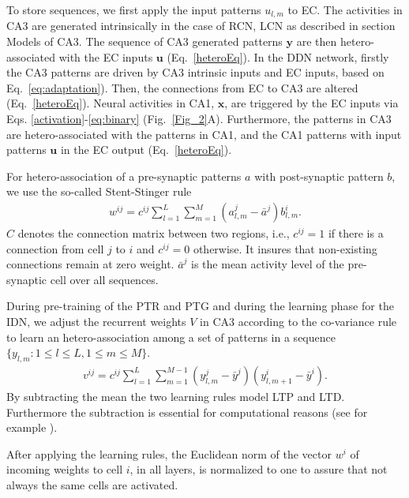 \documentclass[utf8]{frontiersSCNS} %
\begin{document}
To store sequences, we first apply the input patterns $u_{l,m}$ to EC. The activities in CA3 are generated intrinsically in the case of RCN, LCN as described in section Models of CA3. The sequence of CA3 generated patterns $\mathbf y$ are then hetero-associated with the EC inputs $\mathbf u$ (Eq.~\ref{heteroEq}). 
%
In the DDN network, firstly the CA3 patterns are driven by CA3 intrinsic inputs and EC inputs, based on Eq.~\ref{eq:adaptation}). Then, the connections from EC to CA3 are altered (Eq.~\ref{heteroEq}).
%
Neural activities in CA1, $\mathbf x$, are triggered by the EC inputs via Eqs. \ref{activation}-\ref{eq:binary} (Fig.~\ref{Fig_2}A). Furthermore, the patterns in CA3 are hetero-associated with the patterns in CA1, and the CA1 patterns with input patterns $\mathbf u$ in the EC output (Eq.~\ref{heteroEq}). 

For hetero-association of a pre-synaptic patterns $a$ with post-synaptic pattern $b$, we use the so-called Stent-Stinger rule \cite{stent1973physiological}
%
\begin{align}
	\label{heteroEq}
	w^{ij} = c^{ij}\sum_{l=1}^L{\sum_{m=1}^M(a^j_{l, m}  - \bar {a}^j)b_{l, m}^i}.
\end{align}
$C$ denotes the connection matrix between two regions, i.e., $c^{ij} = 1$ if there is a connection from cell $j$ to $i$ and $c^{ij} = 0$ otherwise. It insures that non-existing connections remain at zero weight. $\bar{a}^j$ is the mean activity level of the pre-synaptic cell over all sequences. 

During pre-training of the PTR and PTG and during the learning phase for the IDN, we adjust the recurrent weights $V$ in CA3 according to the co-variance rule \cite{sejnowski1977storing} to learn an hetero-association among a set of patterns in a sequence $\{ y_{l, m}: 1\le l \le L, 1\le m \le M\}$.
\begin{align}
	\label{heteroca3Eq}
	v^{ij} =  c^{ij}\sum_{l=1}^L{\sum_{m=1}^{M-1}(y^j_{l, m}  - \bar {y}^j)(y_{l, m+1}^i - \bar{y}^i)}.
\end{align}
By subtracting the mean the two learning rules model LTP and LTD. Furthermore the subtraction is essential for computational reasons (see for example \cite[chapter 8.2]{amit1992modeling}).

After applying the learning rules, the Euclidean norm of the vector $w^i$ of incoming weights to cell $i$, in all layers, is normalized to one to assure that not always the same cells are activated. 
\end{document}
